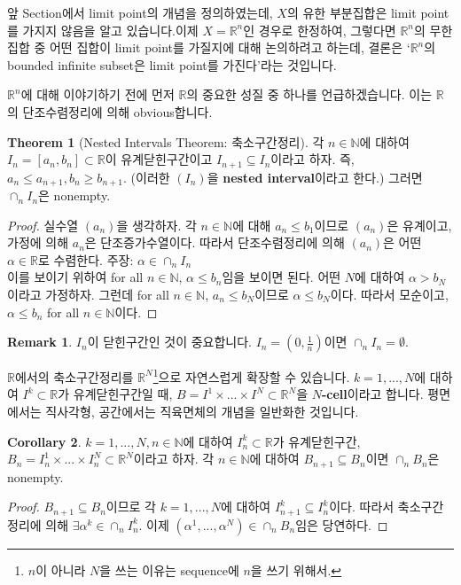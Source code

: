 \documentclass[12pt]{article}
\theoremstyle{definition}
\newtheorem{thm}{Theorem}[section]
\newtheorem{cor}[thm]{Corollary}
\newtheorem*{rem}{Remark}
\def\NN{\mathbb{N}}
\def\RR{\mathbb{R}}
\begin{document}
앞 Section에서 limit point의 개념을 정의하였는데, \(X\)의 유한 부분집합은 limit point를 가지지 않음을 알고 있습니다.이제 \(X=\RR^n\)인 경우로 한정하여, 그렇다면 \(\RR^n\)의 무한집합 중 어떤 집합이 limit point를 가질지에 대해 논의하려고 하는데, 결론은 `\(\RR^n\)의 bounded infinite subset은 limit point를 가진다'라는 것입니다.

\(\RR^n\)에 대해 이야기하기 전에 먼저 \(\RR\)의 중요한 성질 중 하나를 언급하겠습니다. 이는 \(\RR\)의 단조수렴정리에 의해 obvious합니다.

	\begin{thm}[Nested Intervals Theorem: 축소구간정리]
		각 \(n \in \NN\)에 대하여 \(I_n = [a_n, b_n] \subset \RR\)이 유계닫힌구간이고 \(I_{n+1} \subseteq I_n\)이라고 하자. 즉, \(a_n \le a_{n+1}, b_n \ge b_{n+1}\). (이러한 \((I_n)\)을 \textbf{nested interval}이라고 한다.) 그러면 \(\cap_n I_n\)은 nonempty.
	\end{thm}
	\begin{proof}
		실수열 \((a_n)\)을 생각하자. 각 \(n \in \mathbb{N}\)에 대해 \(a_n \le b_1\)이므로 \((a_n)\)은 유계이고, 가정에 의해 \(a_n\)은 단조증가수열이다. 따라서 단조수렴정리에 의해 \((a_n)\)은 어떤 \(\alpha \in \RR\)로 수렴한다. 주장: \(\alpha \in \cap_n I_n\)\\
		이를 보이기 위하여 for all \(n \in \NN\), \(\alpha \le b_n\)임을 보이면 된다. 어떤 \(N\)에 대하여 \(\alpha > b_N\)이라고 가정하자. 그런데 for all \(n \in \NN\), \(a_n \le b_N\)이므로 \(\alpha \le b_N\)이다. 따라서 모순이고, \(\alpha \le b_n\) for all \(n \in \NN\)이다.
	\end{proof}

	\begin{rem}
		\(I_n\)이 닫힌구간인 것이 중요합니다. \(I_n = (0, \frac{1}{n})\)이면 \(\cap_n I_n = \emptyset \).
	\end{rem}

\(\RR\)에서의 축소구간정리를 \(\RR^N\)\footnote{\(n\)이 아니라 \(N\)을 쓰는 이유는 sequence에 \(n\)을 쓰기 위해서.}으로 자연스럽게 확장할 수 있습니다. \(k = 1, ..., N\)에 대하여 \(I^k \subset \RR\)가 유계닫힌구간일 때, \(B = I^1 \times ... \times I^N \subset \RR^N\)을 \textbf{\(N\)-cell}이라고 합니다. 평면에서는 직사각형, 공간에서는 직육면체의 개념을 일반화한 것입니다.

	\begin{cor} \label{cor Ncell}
		\(k = 1, ..., N, n \in \NN\)에 대하여 \(I_n^k \subset \RR\)가 유계닫힌구간, \(B_n = I_n^1 \times ... \times I_n^N \subset \RR^N\)이라고 하자. 각 \(n \in \NN\)에 대하여 \(B_{n+1} \subseteq B_n\)이면 \(\cap_n B_n\)은 nonempty.
	\end{cor}
	\begin{proof}
		\(B_{n+1} \subseteq B_n\)이므로 각 \(k = 1, ..., N\)에 대하여 \(I_{n+1}^k \subseteq I_n^k\)이다. 따라서 축소구간정리에 의해 \(\exists \alpha^k \in \cap_n I_n^k\). 이제 \((\alpha^1, ..., \alpha^N) \in \cap_n B_n\)임은 당연하다.
	\end{proof}
\end{document}
